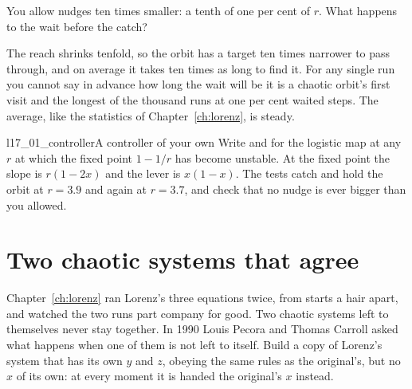 \begin{think}
You allow nudges ten times smaller: a tenth of one per cent of $r$. What
happens to the wait before the catch?
\end{think}



\noindent
The reach shrinks tenfold, so the orbit has a target ten times narrower to
pass through, and on average it takes ten times as long to find it. For any
single run you cannot say in advance how long the wait will be \dash{} it is
a chaotic orbit's first visit \dash{} and the longest of the thousand runs at
one per cent waited  steps. The average, like the
statistics of Chapter~\ref{ch:lorenz}, is steady.

\begin{lab}{l17_01_controller}{A controller of your own}
Write  and  for the logistic map at any $r$ at which
the fixed point $1 - 1/r$ has become unstable. At the fixed point the slope
is $r(1 - 2x)$ and the lever is $x(1 - x)$. The tests catch and hold the orbit
at $r = \num{3.9}$ and again at $r = \num{3.7}$, and check that no nudge is
ever bigger than you allowed.
\end{lab}

\section{Two chaotic systems that agree}
\label{sec:ch17-sync}

\noindent
Chapter~\ref{ch:lorenz} ran Lorenz's three equations twice, from starts a
hair apart, and watched the two runs part company for good. Two chaotic
systems left to themselves never stay together. In 1990 Louis Pecora and
Thomas Carroll asked what happens when one of them is not left to itself.
Build a copy of Lorenz's system that has its own $y$ and $z$, obeying the same
rules as the original's, but no $x$ of its own: at every moment it is handed
the original's $x$ instead.


